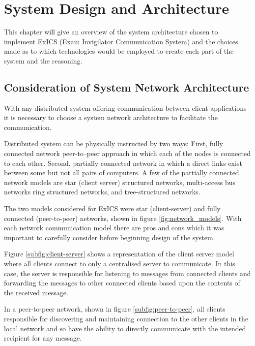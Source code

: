 \chapter{System Design and Architecture}

\label{ch:systemarchitecture}

This chapter will give an overview of the system architecture chosen to implement ExICS (Exam Invigilator Communication System) and the choices made as to which technologies would be employed to create each part of the system and the reasoning.

\section{Consideration of System Network Architecture}

\FloatBarrier

With any distributed system offering communication between client applications it is necessary to choose a system network architecture to facilitate the communication.

Distributed system can be physically instructed by two ways: First, fully connected network peer-to–peer approach in which each of the nodes is connected to each other. Second, partially connected network in which a direct links exist between some but not all pairs of computers. A few of the partially connected network models are star (client server) structured networks, multi-access bus networks ring structured networks, and tree-structured networks.\cite{designingChatRoomApp}

The two models considered for ExICS were star (client-server) and fully connected (peer-to-peer) networks, shown in figure \ref{fig:network_models}.  With each network communication model there are pros and cons which it was important to carefully consider before beginning design of the system.

Figure \ref{subfig:client-server} shows a representation of the client server model where all clients connect to only a centralised server to communicate.  In this case, the server is responsible for listening to messages from connected clients and forwarding the messages to other connected clients based upon the contents of the received message.

In a peer-to-peer network, shown in figure \ref{subfig:peer-to-peer}, all clients responsible for discovering and maintaining connection to the other clients in the local network and so have the ability to directly communicate with the intended recipient for any message.


